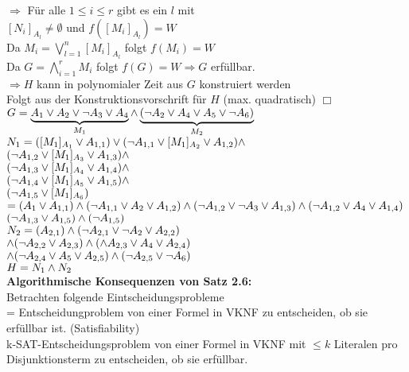 $\Rightarrow$ Für alle $1 \leq i \leq r$ gibt es ein $l$ mit\\
$[N_i]_{A_l} \neq \emptyset$ und $f([M_i]_{A_l}) = W$\\
Da $M_i = \bigvee_{l=1}^n [M_i]_{A_l}$ folgt $f(M_i) = W$\\
Da $G = \bigwedge_{i=1}^r M_i$ folgt $f(G) = W \Rightarrow G $ erfüllbar.\\

$\Rightarrow H$ kann in polynomialer Zeit aus $G$ konstruiert werden\\
Folgt aus der Konstruktionsvorschrift für $H$ (max. quadratisch) $\Box$\\

\beispiel{}
$G = \underbrace{ A_1 \vee A_2 \vee \neg A_3 \vee A_4 }_{M_1} \wedge \underbrace{ (\neg A_2 \vee A_4 \vee A_5 \vee \neg A_6) }_{M_2}$\\

$N_1 = ([M_1]_{A_1} \vee A_{1,1}) \vee (\neg A_{1,1} \vee [M_1]_{A_2} \vee A_{1,2}) \wedge$\\
$( \neg A_{1,2} \vee [M_1]_{A_3} \vee A_{1,3}) \wedge$\\
$(\neg A_{1,3} \vee [M_1]_{A_4} \vee A_{1,4} ) \wedge$\\
$(\neg A_{1,4} \vee [M_1]_{A_5} \vee A_{1,5}) \wedge$\\
$(\neg A_{1,5} \vee [M_1]_{A_6})$\\
$= (A_1 \vee A_{1,1}) \wedge (\neg A_{1,1} \vee A_2 \vee A_{1,2}) \wedge ( \neg A_{1,2} \vee \neg A_3 \vee A_{1,3}) \wedge ( \neg A_{1,2} \vee A_4 \vee A_{1,4})$\\
$(\neg A_{1,3} \vee A_{1,5}) \wedge (\neg A_{1,5})$\\

$N_2 = (A_{2,1}) \wedge ( \neg A_{2,1} \vee \neg A_2 \vee A_{2,2})$\\
$\wedge (\neg A_{2,2} \vee A_{2,3}) \wedge (\wedge A_{2,3} \vee A_4 \vee A_{2,4})$\\
$\wedge ( \neg A_{2,4} \vee A_5 \vee A_{2,5}) \wedge (\neg A_{2,5} \vee \neg A_6)$\\
$H = N_1 \wedge N_2$\\

\textbf{Algorithmische Konsequenzen von Satz 2.6:}\\
Betrachten folgende Eintscheidungsprobleme\\
 = Entscheidungproblem von einer Formel in VKNF zu entscheiden, ob sie erfüllbar ist. (Satisfiability)\\

k-SAT-Entscheidungsproblem von einer Formel in VKNF mit $\leq k$ Literalen pro Disjunktionsterm zu entscheiden, ob sie erfüllbar.\\

